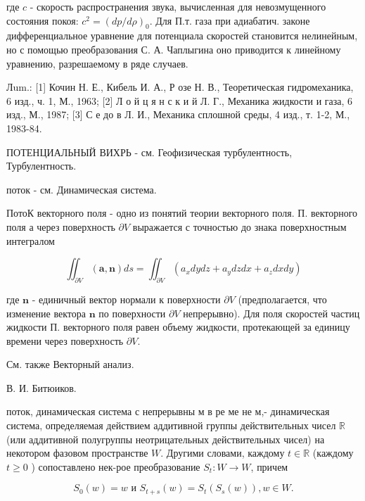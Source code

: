 \documentclass[10pt]{article}
\begin{document}
где $c$ - скорость распространения звука, вычисленная для невозмущенного состояния покоя: $c^{2}=(d p / d \rho)_{0}$. Для П.т. газа при адиабатич. законе дифференциальное уравнение для потенциала скоростей становится нелинейным, но с помощью преобразования С. А. Чаплыгина оно приводится к линейному уравнению, разрешаемому в ряде случаев.



Лum.: [1] Кочин Н. Е., Кибель И. А., Р озе Н. В., Теоретическая гидромеханика, 6 изд., ч. 1, М., 1963; [2] Л о й ц я н с к и й Л. Г., Механика жидкости и газа, 6 изд., М., 1987; [3] С е до в Л. И., Механика сплошной среды, 4 изд., т. 1-2, М., 1983-84.



ПОТЕНЦИАЛЬНЫЙ ВИХРЬ - см. Геофизическая турбулентность, Турбулентность.



поток - см. Динамическая система.



ПотоК векторного поля - одно из понятий теории векторного поля. П. векторного поля а через поверхность $\partial V$ выражается с точностью до знака поверхностным интегралом



\[

\iint_{\partial V}(\boldsymbol{a}, \boldsymbol{n}) d s=\iint_{\partial V}\left(a_{x} d y d z+a_{y} d z d x+a_{z} d x d y\right)

\]



где $\boldsymbol{n}$ - единичный вектор нормали к поверхности $\partial V$ (предполагается, что изменение вектора $\boldsymbol{n}$ по поверхности $\partial V$ непрерывно). Для поля скоростей частиц жидкости П. векторного поля равен объему жидкости, протекающей за единицу времени через поверхность $\partial V$.



См. также Векторный анализ.



В. И. Битюиков.



поток, динамическая система с непрерывны м в ре ме не м,- динамическая система, определяемая действием аддитивной группы действительных чисел $\mathbb{R}$ (или аддитивной полугруппы неотрицательных действительных чисел) на некотором фазовом пространстве $W$. Другими словами, каждому $t \in \mathbb{R}$ (каждому $t \geqslant 0$ ) сопоставлено нек-рое преобразование $S_{t}: W \rightarrow W$, причем



\[

S_{0}(w)=w \text { и } S_{t+s}(w)=S_{t}\left(S_{s}(w)\right), w \in W .

\]
\end{document}
